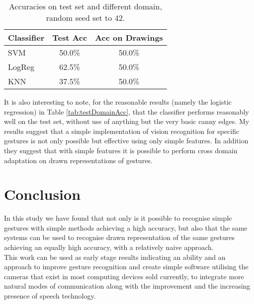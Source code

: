 \documentclass[11pt, a4paper]{article}
\begin{document}
\begin{table}[h]
  \centering
  \small
    \begin{tabular}{l|cc}
    Classifier & Test Acc & Acc on Drawings \\\hline
    SVM        & 50.0\%   & 50.0\%          \\
    LogReg     & 62.5\%   & 50.0\%          \\
    KNN        & 37.5\%   & 50.0\%
    \end{tabular}
  \caption{Accuracies on test set and different domain, random seed set to 42.}
  \label{tab:seedDomainAcc}
\end{table}
It is also interesting to note, for the reasonable results (namely the logistic regression) in Table \ref{tab:testDomainAcc}, that the classifier performs reasonably well on the test set, without use of anything but the very basic canny edges. My results suggest that a simple implementation of vision recognition for specific gestures is not only possible but effective using only simple features. In addition they suggest that with simple features it is possible to perform cross domain adaptation on drawn representations of gestures. 
\section{Conclusion}
In this study we have found that not only is it possible to recognise simple gestures with simple methods achieving a high accuracy, but also that the same systems can be used to recognise drawn representation of the same gestures achieving an equally high accuracy, with a relatively naive approach.\\
This work can be used as early stage results indicating an ability and an approach to improve gesture recognition and create simple software utilising the cameras that exist in most computing devices sold currently, to integrate more natural modes of communication along with the improvement and the increasing presence of speech technology.
\end{document}
